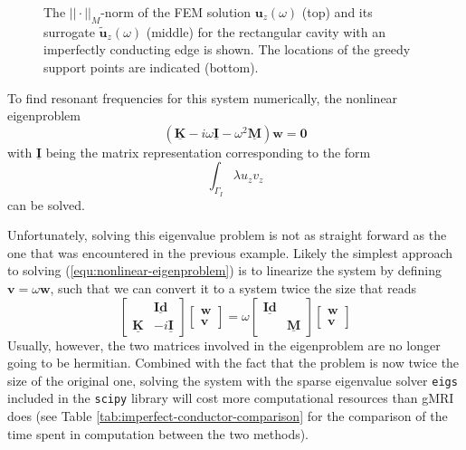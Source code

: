 \documentclass[11pt, a4paper]{article}
\begin{document}
\begin{figure}[ht]
    \centering
    
    \caption{The $||\cdot||_M$-norm of the \acrshort{FEM} solution $\mathbf{u}_z(\omega)$ (top) and
    its surrogate $\mathbf{\tilde{u}}_z(\omega)$ (middle) for the rectangular cavity with
    an imperfectly conducting edge is shown. The locations of the greedy support
    points are indicated (bottom).}
    \label{fig:imperfect-conductor-norms}
\end{figure}

To find resonant frequencies for this system numerically, the nonlinear eigenproblem
\begin{equation}
    (\mathbf{\underline{K}} - i \omega \mathbf{\underline{I}} - \omega^2 \mathbf{\underline{M}}) \mathbf{w} = \mathbf{0} \label{equ:nonlinear-eigenproblem}
\end{equation}
with $\mathbf{\underline{I}}$ being the matrix representation corresponding to the form
\begin{equation}
    \int_{\Gamma_I} \lambda u_z v_z 
\end{equation}
can be solved.

Unfortunately, solving this eigenvalue problem is not as straight forward as the
one that was encountered in the previous example. Likely the simplest approach
to solving (\ref{equ:nonlinear-eigenproblem}) is to linearize the system by
defining $\mathbf{v} = \omega \mathbf{w}$, such that we can convert it to a
system twice the size that reads
\begin{equation}
    \begin{bmatrix}
         & \mathbf{\underline{Id}} \\
        \mathbf{\underline{K}} & -i \mathbf{\underline{I}}
    \end{bmatrix}
    \begin{bmatrix}
        \mathbf{w} \\
        \mathbf{v}
    \end{bmatrix}
    =
    \omega
    \begin{bmatrix}
        \mathbf{\underline{Id}} & \\
         & \boldsymbol{\underline{M}}
    \end{bmatrix}
    \begin{bmatrix}
        \mathbf{w} \\
        \mathbf{v}
    \end{bmatrix}
\end{equation}
Usually, however, the two matrices involved in the eigenproblem are no longer
going to be hermitian. Combined with the fact that the problem is now twice
the size of the original one, solving the system with the sparse eigenvalue
solver \texttt{eigs} included in the \texttt{scipy} library will cost more
computational resources than \acrshort{gMRI} does (see Table \ref{tab:imperfect-conductor-comparison}
for the comparison of the time spent in computation between the two methods).
\end{document}
